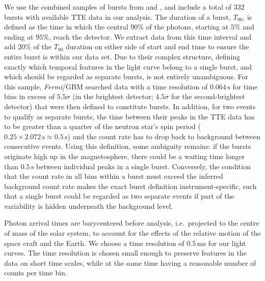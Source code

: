 \documentclass[12pt]{emulateapj}
\newcommand{\project}[1]{\textsl{#1}}
\newcommand{\fermi}{\project{Fermi}}
\begin{document}
We use the combined samples of bursts from \citet{vonkienlin2012} and \citet{vanderhorst2012}, and include a total of $332$ bursts with available TTE data in our analysis. The duration of a burst, $T_{90}$, is defined as the time in which the central $90\%$ of the photons, starting at $5\%$ and ending at $95\%$, reach the detector.  We extract data from this time interval and add $20\%$ of the $T_{90}$ duration on either side of start and end time to ensure the entire burst is within our data set. Due to their complex structure, defining exactly which temporal features in the light curve belong to a single burst, and which should be regarded as separate bursts, is 
not entirely unambiguous. For this sample, \citet{vanderhorst2012} \fermi/GBM searched data with a time resolution of $0.064\,\mathrm{s}$ for time bins in excess of $5.5\sigma$ 
(in the brightest detector; $4.5\sigma$ for the second-brightest detector) that were then defined to constitute bursts. In addition, for two events to qualify as separate bursts, the time between their peaks
in the TTE data has to be greater than a quarter of the neutron star's spin period ($0.25\times2.072\,\mathrm{s} \approx 0.5\,\mathrm{s}$) 
and the count rate has to drop back to background between consecutive events. 
Using this definition, some ambiguity remains: if the bursts originate high up in the magnetosphere, there could be a waiting 
time longer than $0.5\,\mathrm{s}$ between individual peaks in a single burst. Conversely, the condition that the count rate in all bins within a burst must
exceed the inferred background count rate makes the exact burst definition instrument-specific, such that a single burst could be regarded as two separate events
if part of the variability is hidden underneath the background level.

Photon arrival times are barycentered before analysis, i.e.\ projected to the centre of mass of the solar system, to account for the effects of the relative motion of the space craft and the Earth.
We choose a time resolution of $0.5\,\mathrm{ms}$ for our light curves. The time resolution is chosen small enough to preserve features
in the data on short time scales, while at the same time having a reasonable number of counts per time bin. 
\end{document}
